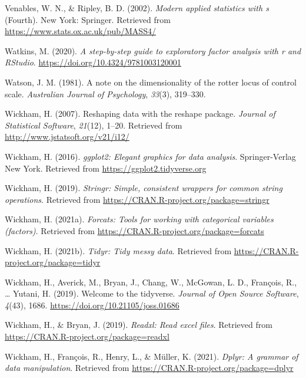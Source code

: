 \documentclass[
  english,
  man]{apa6}
\newlength{\cslhangindent}
\newlength{\cslentryspacingunit} %
\newenvironment{CSLReferences}[2] %
 {%
  \setlength{\parindent}{0pt}
  \ifodd #1
  \let\oldpar\par
  \def\par{\hangindent=\cslhangindent\oldpar}
  \fi
  \setlength{\parskip}{#2\cslentryspacingunit}
 }%
 {}
\begin{document}
\begin{CSLReferences}{1}{0}
\leavevmode{}%
Venables, W. N., \& Ripley, B. D. (2002). \emph{Modern applied statistics with s} (Fourth). New York: Springer. Retrieved from \url{https://www.stats.ox.ac.uk/pub/MASS4/}

\leavevmode{}%
Watkins, M. (2020). \emph{A step-by-step guide to exploratory factor analysis with r and RStudio}. \url{https://doi.org/10.4324/9781003120001}

\leavevmode{}%
Watson, J. M. (1981). A note on the dimensionality of the rotter locus of control scale. \emph{Australian Journal of Psychology}, \emph{33}(3), 319--330.

\leavevmode{}%
Wickham, H. (2007). Reshaping data with the {reshape} package. \emph{Journal of Statistical Software}, \emph{21}(12), 1--20. Retrieved from \url{http://www.jstatsoft.org/v21/i12/}

\leavevmode{}%
Wickham, H. (2016). \emph{ggplot2: Elegant graphics for data analysis}. Springer-Verlag New York. Retrieved from \url{https://ggplot2.tidyverse.org}

\leavevmode{}%
Wickham, H. (2019). \emph{Stringr: Simple, consistent wrappers for common string operations}. Retrieved from \url{https://CRAN.R-project.org/package=stringr}

\leavevmode{}%
Wickham, H. (2021a). \emph{Forcats: Tools for working with categorical variables (factors)}. Retrieved from \url{https://CRAN.R-project.org/package=forcats}

\leavevmode{}%
Wickham, H. (2021b). \emph{Tidyr: Tidy messy data}. Retrieved from \url{https://CRAN.R-project.org/package=tidyr}

\leavevmode{}%
Wickham, H., Averick, M., Bryan, J., Chang, W., McGowan, L. D., François, R., \ldots{} Yutani, H. (2019). Welcome to the {tidyverse}. \emph{Journal of Open Source Software}, \emph{4}(43), 1686. \url{https://doi.org/10.21105/joss.01686}

\leavevmode{}%
Wickham, H., \& Bryan, J. (2019). \emph{Readxl: Read excel files}. Retrieved from \url{https://CRAN.R-project.org/package=readxl}

\leavevmode{}%
Wickham, H., François, R., Henry, L., \& Müller, K. (2021). \emph{Dplyr: A grammar of data manipulation}. Retrieved from \url{https://CRAN.R-project.org/package=dplyr}


\end{CSLReferences}
\end{document}
